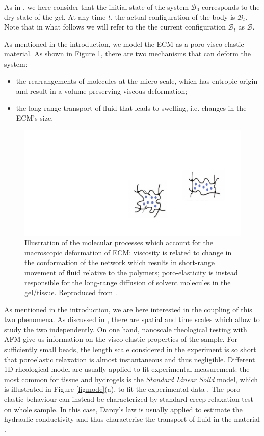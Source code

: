 \documentclass[runningheads]{llncs}
\begin{document}
As in \cite{sarah}, we here consider that the initial state of the system $\mathcal{B}_0$ corresponds to the dry state of the gel. At any time $t$, the actual configuration of the body is $\mathcal{B}_t$. Note that in what follows we will refer to the the current configuration $\mathcal{B}_t$ as $\mathcal{B}$. 

As mentioned in the introduction, we model the ECM as a poro-visco-elastic material. As shown in Figure \ref{deformation}, there are two mechanisms that can deform the system: 
\begin{itemize}
	\item [1.] the rearrangements of molecules at the micro-scale,  which has entropic origin and result in a volume-preserving viscous deformation;
	\item[2.] the long range transport of fluid that leads to swelling, i.e. changes in the ECM's size. 
\end{itemize}

\begin{figure}[h!]
	\centering
	\includegraphics[scale=0.325]{images/visco_poro}
	\caption{Illustration of the molecular processes which account for the macroscopic deformation of ECM: viscosity is related to change in the conformation of the network which results in short-range movement of fluid relative to the polymers; poro-elasticity is instead responsible for the long-range diffusion of solvent molecules in the gel/tissue. Reproduced from \cite{viscoporo}.}
	\label{deformation}
\end{figure}
 
As mentioned in the introduction, we are here interested in the coupling of this two phenomena. As discussed in \cite{viscoporo}, there are spatial and time scales which allow to study the two independently. On one hand, nanoscale rheological testing with AFM give us information on the visco-elastic properties of the sample. For sufficiently small beads, the length scale considered in the experiment is so short that poroelastic relaxation is almost instantaneous and thus negligible. Different 1D rheological model are usually applied to fit experimental measurement: the most common for tissue and hydrogels is the \textit{Standard Linear Solid} model, which is illustrated in Figure \ref{figmode}(a), to fit the experimental data \cite{Article1,viscoporo}. The poro-elastic behaviour can instead be characterized by standard creep-relaxation test on whole sample. In this case, Darcy's law is usually applied to estimate the hydraulic conductivity and thus characterise the transport of fluid in the material \cite{Netti,viscoporo}. 
\end{document}
